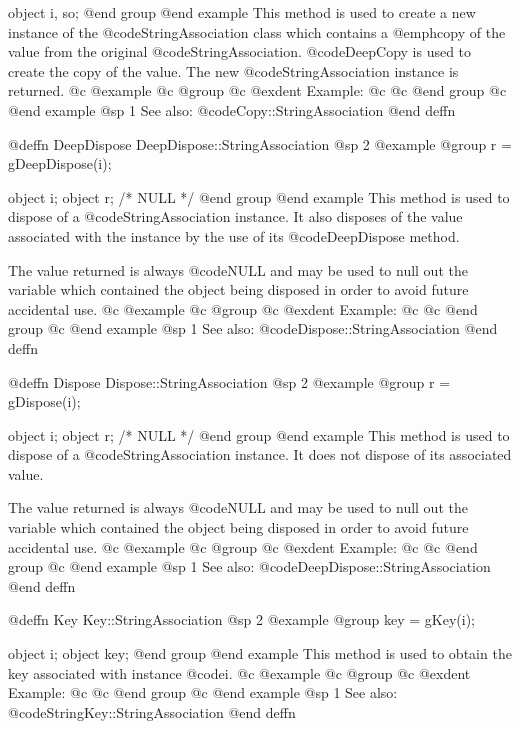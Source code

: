 object  i, so;
@end group
@end example
This method is used to create a new instance of the
@code{StringAssociation} class which contains a @emph{copy} of the
value from the original @code{StringAssociation}.  @code{DeepCopy} is
used to create the copy of the value.  The new
@code{StringAssociation} instance is returned.
@c @example
@c @group
@c @exdent Example:
@c 
@c @end group
@c @end example
@sp 1
See also:  @code{Copy::StringAssociation}
@end deffn








@deffn {DeepDispose} DeepDispose::StringAssociation
@sp 2
@example
@group
r = gDeepDispose(i);

object  i;
object  r;     /*  NULL  */
@end group
@end example
This method is used to dispose of a @code{StringAssociation} instance.
It also disposes of the value associated with the instance by the
use of its @code{DeepDispose} method.

The value returned is always @code{NULL} and may be used to null out
the variable which contained the object being disposed in order to
avoid future accidental use.
@c @example
@c @group
@c @exdent Example:
@c 
@c @end group
@c @end example
@sp 1
See also:  @code{Dispose::StringAssociation}
@end deffn












@deffn {Dispose} Dispose::StringAssociation
@sp 2
@example
@group
r = gDispose(i);

object  i;
object  r;     /*  NULL  */
@end group
@end example
This method is used to dispose of a @code{StringAssociation} instance.
It does not dispose of its associated value.

The value returned is always @code{NULL} and may be used to null out
the variable which contained the object being disposed in order to
avoid future accidental use.
@c @example
@c @group
@c @exdent Example:
@c 
@c @end group
@c @end example
@sp 1
See also:  @code{DeepDispose::StringAssociation}
@end deffn









@deffn {Key} Key::StringAssociation
@sp 2
@example
@group
key = gKey(i);

object  i;
object  key;
@end group
@end example
This method is used to obtain the key associated with instance @code{i}.
@c @example
@c @group
@c @exdent Example:
@c 
@c @end group
@c @end example
@sp 1
See also:  @code{StringKey::StringAssociation}
@end deffn










